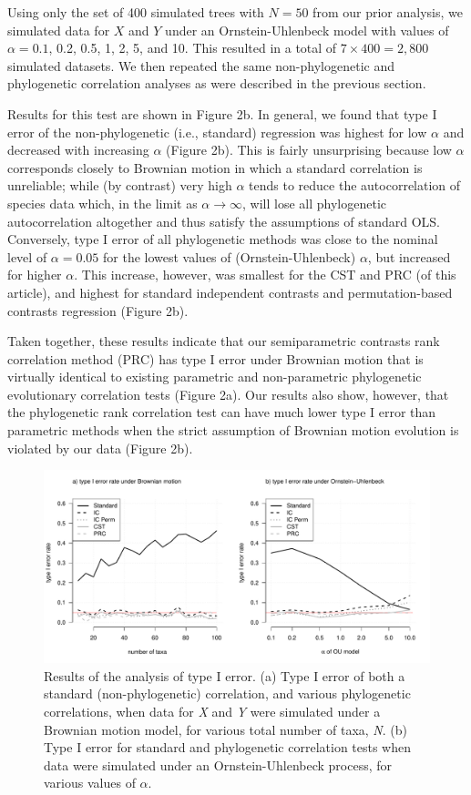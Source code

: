 \documentclass[fleqn,10pt,lineno]{wlpeerj} %
\begin{document}
Using only the set of 400 simulated trees with \(N=50\) from our prior analysis, we simulated data for \(X\) and \(Y\) under an Ornstein-Uhlenbeck model with values of \(\alpha = 0.1\), 0.2, 0.5, 1, 2, 5, and 10. This resulted in a total of \(7 \times 400 = 2,800\) simulated datasets. We then repeated the same non-phylogenetic and phylogenetic correlation analyses as were described in the previous section.

Results for this test are shown in Figure 2b. In general, we found that type I error of the non-phylogenetic (i.e., standard) regression was highest for low \(\alpha\) and decreased with increasing \(\alpha\) (Figure 2b). This is fairly unsurprising because low \(\alpha\) corresponds closely to Brownian motion in which a standard correlation is unreliable; while (by contrast) very high \(\alpha\) tends to reduce the autocorrelation of species data which, in the limit as \(\alpha \rightarrow \infty\), will lose all phylogenetic autocorrelation altogether and thus satisfy the assumptions of standard OLS. Conversely, type I error of all phylogenetic methods was close to the nominal level of \(\alpha = 0.05\) for the lowest values of (Ornstein-Uhlenbeck) \(\alpha\), but increased for higher \(\alpha\). This increase, however, was smallest for the CST and PRC (of this article), and highest for standard independent contrasts and permutation-based contrasts regression (Figure 2b).

Taken together, these results indicate that our semiparametric contrasts rank correlation method (PRC) has type I error under Brownian motion that is virtually identical to existing parametric and non-parametric phylogenetic evolutionary correlation tests (Figure 2a). Our results also show, however, that the phylogenetic rank correlation test can have much lower type I error than parametric methods when the strict assumption of Brownian motion evolution is violated by our data (Figure 2b).

\begin{figure}
\includegraphics[width=1\linewidth]{Harmon-and-Revell_NonParametricPCM.PeerJ_files/figure-latex/Harmon-fig2-1} \caption{Results of the analysis of type I error. (a) Type I error of both a standard (non-phylogenetic) correlation, and various phylogenetic correlations, when data for \emph{X} and \emph{Y} were simulated under a Brownian motion model, for various total number of taxa, \emph{N}. (b) Type I error for standard and phylogenetic correlation tests when data were simulated under an Ornstein-Uhlenbeck process, for various values of $\alpha$.}\label{fig:Harmon-fig2}
\end{figure}
\end{document}
